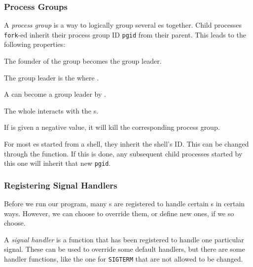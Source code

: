 \subsubsection{Process Groups}\label{subsubsec:Process_Groups}
\begin{definition}\label{def:Process_Group}
  A \emph{process group} is a way to logically group several es together.
  Child processes \texttt{fork}-ed inherit their process group ID \texttt{pgid} from their parent.
  This leads to the following properties:
  \begin{propertylist}
  \item The founder of the group becomes the group leader.
  \item The group leader is the  where .
  \item A  can become a group leader by .
  \item The whole  interacts with the s.
  \item If  is given a negative value, it will kill the corresponding process group.
  \end{propertylist}
\end{definition}

\begin{remark*}
  For most es started from a shell, they inherit the shell's  ID.\@
  This can be changed through the  function.
  If this is done, any subsequent child processes started by this one will inherit that new \texttt{pgid}.
\end{remark*}

\subsubsection{Registering Signal Handlers}\label{subsubsec:Register_Signal_Handlers}
Before we run our program, many s are registered to handle certain s in certain ways.
However, we can choose to override them, or define new ones, if we so choose.

\begin{definition}\label{def:Signal_Handler}
  A \emph{signal handler} is a function that has been registered to handle one particular signal.
  These can be used to override some default handlers, but there are some handler functions, like the one for \texttt{SIGTERM} that are not allowed to be changed.
\end{definition}


